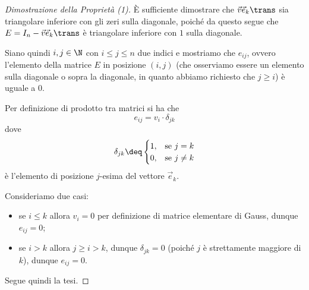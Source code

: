 \begin{proof}[Dimostrazione della Proprietà (1)]
    È sufficiente dimostrare che $\vec v\vec e_k\trans$ sia triangolare inferiore con gli zeri sulla diagonale, poiché da questo segue che $E = I_n - \vec v\vec e_k\trans$ è triangolare inferiore con $1$ sulla diagonale. 
    
    Siano quindi $i, j \in \N$ con $i \leq j \leq n$ due indici e mostriamo che $e_{ij}$, ovvero l'elemento della matrice $E$ in posizione $(i, j)$ (che osserviamo essere un elemento sulla diagonale o sopra la diagonale, in quanto abbiamo richiesto che $j \geq i$) è uguale a $0$.

    Per definizione di prodotto tra matrici si ha che \[
        e_{ij} = v_i \cdot \delta_{jk}
    \] dove \[
        \delta_{jk} \deq \begin{cases}
            1, &\text{se } j = k \\
            0, &\text{se } j \neq k 
        \end{cases}
    \] è l'elemento di posizione $j$-esima del vettore $\vec e_k$.

    Consideriamo due casi: \begin{itemize}
        \item se $i \leq k$ allora $v_i = 0$ per definizione di matrice elementare di Gauss, dunque $e_{ij} = 0$;
        \item se $i > k$ allora $j \geq i > k$, dunque $\delta_{jk} = 0$ (poiché $j$ è strettamente maggiore di $k$), dunque $e_{ij} = 0$.   
    \end{itemize}

    Segue quindi la tesi.
\end{proof}
